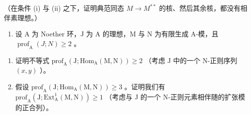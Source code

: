（在条件 (i) 与 (ii) 之下，证明典范同态 \(M \to M^{**}\) 的核、然后其余核，都没有相伴素理想。）

\begin{enumerate}
\def\labelenumi{\arabic{enumi})}
\setcounter{enumi}{17}
\tightlist
\item
  设 A 为 Noether 环，J 为 A 的理想，M 与 N 为有限生成 A-模，且 \(\operatorname{prof}_{\mathrm{A}}(J;N)\geqslant2\) 。
\end{enumerate}

\begin{enumerate}
\def\labelenumi{\alph{enumi})}
\item
  证明不等式 \(\mathrm{prof}_{\mathrm{A}}(\mathrm{J};\mathrm{Hom}_{\mathrm{A}}(\mathrm{M},\mathrm{N}))\geqslant 2\) （考虑 J 中的一个 N-正则序列 \((x,y)\) ）。
\item
  假设 \(\mathrm{prof}_{\mathrm{A}}(\mathrm{J};\mathrm{Hom}_{\mathrm{A}}(\mathrm{M},\mathrm{N}))\geqslant 3\) 。证明我们有 \(\mathrm{prof}_{\mathrm{A}}(\mathrm{J};\mathrm{Ext}_{\mathrm{A}}^{1}(\mathrm{M},\mathrm{N}))\geqslant 1\) （考虑与 J 的一个 N-正则元素相伴随的扩张模的正合列）。
\end{enumerate}

